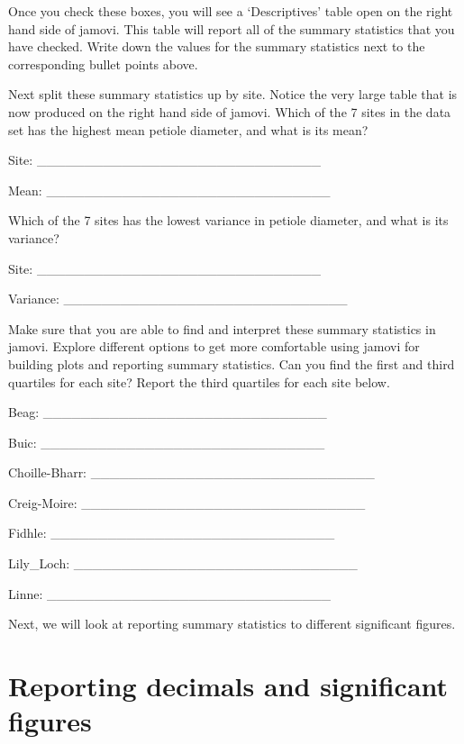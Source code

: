 \documentclass[
  openany]{krantz}
\begin{document}
Once you check these boxes, you will see a `Descriptives' table open on the right hand side of jamovi.
This table will report all of the summary statistics that you have checked.
Write down the values for the summary statistics next to the corresponding bullet points above.

Next split these summary statistics up by site.
Notice the very large table that is now produced on the right hand side of jamovi.
Which of the 7 sites in the data set has the highest mean petiole diameter, and what is its mean?

Site: \_\_\_\_\_\_\_\_\_\_\_\_\_\_\_\_\_\_\_\_\_\_\_\_\_\_\_\_\_\_

Mean: \_\_\_\_\_\_\_\_\_\_\_\_\_\_\_\_\_\_\_\_\_\_\_\_\_\_\_\_\_\_

Which of the 7 sites has the lowest variance in petiole diameter, and what is its variance?

Site: \_\_\_\_\_\_\_\_\_\_\_\_\_\_\_\_\_\_\_\_\_\_\_\_\_\_\_\_\_\_

Variance: \_\_\_\_\_\_\_\_\_\_\_\_\_\_\_\_\_\_\_\_\_\_\_\_\_\_\_\_\_\_

Make sure that you are able to find and interpret these summary statistics in jamovi.
Explore different options to get more comfortable using jamovi for building plots and reporting summary statistics.
Can you find the first and third quartiles for each site?
Report the third quartiles for each site below.

Beag: \_\_\_\_\_\_\_\_\_\_\_\_\_\_\_\_\_\_\_\_\_\_\_\_\_\_\_\_\_\_

Buic: \_\_\_\_\_\_\_\_\_\_\_\_\_\_\_\_\_\_\_\_\_\_\_\_\_\_\_\_\_\_

Choille-Bharr: \_\_\_\_\_\_\_\_\_\_\_\_\_\_\_\_\_\_\_\_\_\_\_\_\_\_\_\_\_\_

Creig-Moire: \_\_\_\_\_\_\_\_\_\_\_\_\_\_\_\_\_\_\_\_\_\_\_\_\_\_\_\_\_\_

Fidhle: \_\_\_\_\_\_\_\_\_\_\_\_\_\_\_\_\_\_\_\_\_\_\_\_\_\_\_\_\_\_

Lily\_Loch: \_\_\_\_\_\_\_\_\_\_\_\_\_\_\_\_\_\_\_\_\_\_\_\_\_\_\_\_\_\_

Linne: \_\_\_\_\_\_\_\_\_\_\_\_\_\_\_\_\_\_\_\_\_\_\_\_\_\_\_\_\_\_

Next, we will look at reporting summary statistics to different significant figures.

\hypertarget{reporting-decimals-and-significant-figures}{%
\section{Reporting decimals and significant figures}\label{reporting-decimals-and-significant-figures}}
\end{document}
